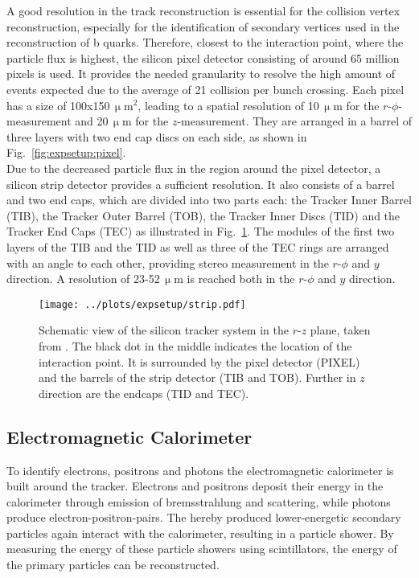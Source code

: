 \noindent A good resolution in the track reconstruction is essential for the collision vertex reconstruction, especially for the identification of secondary vertices used in the reconstruction of b quarks. Therefore, closest to the interaction point, where the particle flux is highest, the silicon pixel detector consisting of around 65 million pixels is used. It provides the needed granularity to resolve the high amount of events expected due to the average of 21 collision per bunch crossing. Each pixel has a size of 100x150\,$\upmu$m$^2$, leading to a spatial resolution of 10\,$\upmu$m for the $r$-$\phi$-measurement and 20\,$\upmu$m for the $z$-measurement. They are arranged in a barrel of three layers with two end cap discs on each side, as shown in Fig.~\ref{fig:expsetup:pixel}.\\

\noindent Due to the decreased particle flux in the region around the pixel detector, a silicon strip detector provides a sufficient resolution. It also consists of a barrel and two end caps, which are divided into two parts each: the Tracker Inner Barrel (TIB), the Tracker Outer Barrel (TOB), the Tracker Inner Discs (TID) and the Tracker End Caps (TEC) as illustrated in Fig.~\ref{fig:expsetup:strip}. The modules of the first two layers of the TIB and the TID as well as three of the TEC rings are arranged with an angle to each other, providing stereo measurement in the $r$-$\phi$ and $y$ direction. A resolution of 23-52\,$\upmu$m is reached both in the $r$-$\phi$ and $y$ direction.

\begin{figure}
    \centering
    \texttt{[image: ../plots/expsetup/strip.pdf]}
    \caption[Schematic view of the silicon tracker system]{Schematic view of the silicon tracker system in the $r$-$z$ plane, taken from \cite{strip_fig}. The black dot in the middle indicates the location of the interaction point. It is surrounded by the pixel detector (PIXEL) and the barrels of the strip detector (TIB and TOB). Further in $z$ direction are the endcaps (TID and TEC).}
    \label{fig:expsetup:strip}
\end{figure}

\subsection*{Electromagnetic Calorimeter}
To identify electrons, positrons and photons the electromagnetic calorimeter is built around the tracker. Electrons and positrons deposit their energy in the calorimeter through emission of bremsstrahlung and scattering, while photons produce electron-positron-pairs. The hereby produced lower-energetic secondary particles again interact with the calorimeter, resulting in a particle shower. By measuring the energy of these particle showers using scintillators, the energy of the primary particles can be reconstructed.\\

